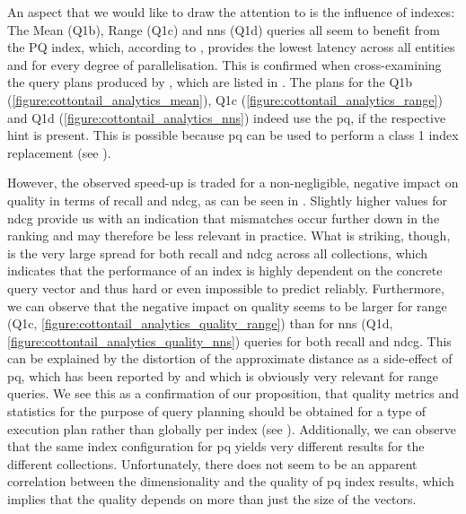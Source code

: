 An aspect that we would like to draw the attention to is the influence of indexes: The Mean (Q1b), Range (Q1c) and \acrshort{nns} (Q1d) queries all seem to benefit from the PQ index, which, according to , provides the lowest latency across all entities and for every degree of parallelisation. This is confirmed when cross-examining the query plans produced by \cottontail{}, which are listed in . The plans for the Q1b (\ref{figure:cottontail_analytics_mean}), Q1c (\ref{figure:cottontail_analytics_range}) and Q1d (\ref{figure:cottontail_analytics_nns}) indeed use the \acrshort{pq}, if the respective hint is present. This is possible because \acrshort{pq} can be used to perform a class 1 index replacement (see ). 

However, the observed speed-up is traded for a non-negligible, negative impact on quality in terms of recall and n\acrshort{dcg}, as can be seen in . Slightly higher values for n\acrshort{dcg} provide us with an indication that mismatches occur further down in the ranking and may therefore be less relevant in practice. What is striking, though, is the very large spread for both recall and n\acrshort{dcg} across all collections, which indicates that the performance of an index is highly dependent on the concrete query vector and thus hard or even impossible to predict reliably. Furthermore, we can observe that the negative impact on quality seems to be larger for range (Q1c, \ref{figure:cottontail_analytics_quality_range}) than for \acrshort{nns} (Q1d, \ref{figure:cottontail_analytics_quality_nns}) queries for both recall and n\acrshort{dcg}. This can be explained by the distortion of the approximate distance as a side-effect of \acrshort{pq}, which has been reported by \cite{Jegou:2010Product} and which is obviously very relevant for range queries. We see this as a confirmation of our proposition, that quality metrics and statistics for the purpose of query planning should be obtained for a type of execution plan rather than globally per index (see ). Additionally, we can observe that the same index configuration for \acrshort{pq} yields very different results for the different collections. Unfortunately, there does not seem to be an apparent correlation between the dimensionality and the quality of \acrshort{pq} index results, which implies that the quality depends on more than just the size of the vectors.

